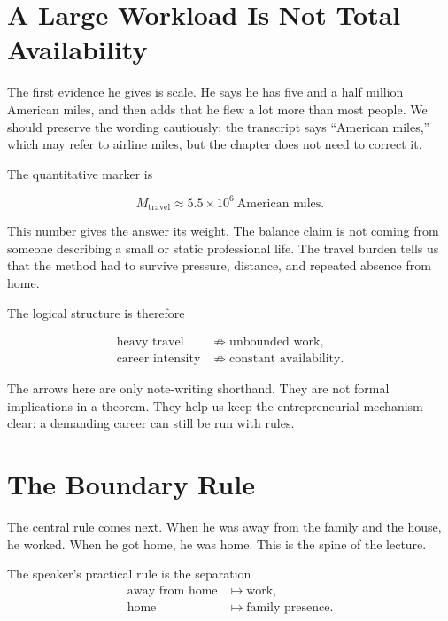 \section{A Large Workload Is Not Total Availability}

The first evidence he gives is scale. He says he has five and a half million American miles, and then adds that he flew a lot more than most people. We should preserve the wording cautiously; the transcript says ``American miles,'' which may refer to airline miles, but the chapter does not need to correct it.

The quantitative marker is

\begin{equation}
M_{\text{travel}}
\approx
5.5 \times 10^{6}
\ \text{American miles}.
\end{equation}

This number gives the answer its weight. The balance claim is not coming from someone describing a small or static professional life. The travel burden tells us that the method had to survive pressure, distance, and repeated absence from home.

The logical structure is therefore

\begin{align}
\text{heavy travel} &\not\Rightarrow \text{unbounded work},\\
\text{career intensity} &\not\Rightarrow \text{constant availability}.
\end{align}

The arrows here are only note-writing shorthand. They are not formal implications in a theorem. They help us keep the entrepreneurial mechanism clear: a demanding career can still be run with rules.

\section{The Boundary Rule}

The central rule comes next. When he was away from the family and the house, he worked. When he got home, he was home. This is the spine of the lecture.

\begin{definition}
The speaker's practical rule is the separation
\begin{equation}
\begin{aligned}
\text{away from home} &\longmapsto \text{work},\\
\text{home} &\longmapsto \text{family presence}.
\end{aligned}
\end{equation}
\end{definition}

